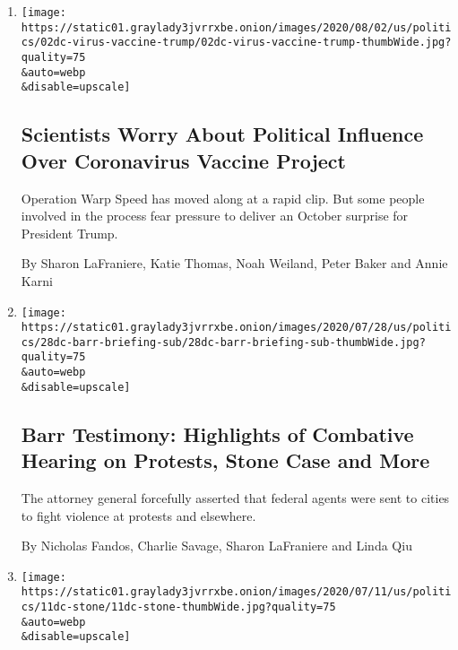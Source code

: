 \begin{enumerate}
\def\labelenumi{\arabic{enumi}.}
\item
  \href{/2020/08/02/us/politics/coronavirus-vaccine.html}{}

  \texttt{[image: https://static01.graylady3jvrrxbe.onion/images/2020/08/02/us/politics/02dc-virus-vaccine-trump/02dc-virus-vaccine-trump-thumbWide.jpg?quality=75\\\&auto=webp\\\&disable=upscale]}

  \hypertarget{scientists-worry-about-political-influence-over-coronavirus-vaccine-project}{%
  \subsection{Scientists Worry About Political Influence Over
  Coronavirus Vaccine
  Project}\label{scientists-worry-about-political-influence-over-coronavirus-vaccine-project}}

  Operation Warp Speed has moved along at a rapid clip. But some people
  involved in the process fear pressure to deliver an October surprise
  for President Trump.

  By Sharon LaFraniere, Katie Thomas, Noah Weiland, Peter Baker and
  Annie Karni
\item
  \href{/2020/07/28/us/politics/william-barr-house-judiciary-hearing.html}{}

  \texttt{[image: https://static01.graylady3jvrrxbe.onion/images/2020/07/28/us/politics/28dc-barr-briefing-sub/28dc-barr-briefing-sub-thumbWide.jpg?quality=75\\\&auto=webp\\\&disable=upscale]}

  \hypertarget{barr-testimony-highlights-of-combative-hearing-on-protests-stone-case-and-more}{%
  \subsection{Barr Testimony: Highlights of Combative Hearing on
  Protests, Stone Case and
  More}\label{barr-testimony-highlights-of-combative-hearing-on-protests-stone-case-and-more}}

  The attorney general forcefully asserted that federal agents were sent
  to cities to fight violence at protests and elsewhere.

  By Nicholas Fandos, Charlie Savage, Sharon LaFraniere and Linda Qiu
\item
  \href{/2020/07/11/us/politics/trump-roger-stone.html}{}

  \texttt{[image: https://static01.graylady3jvrrxbe.onion/images/2020/07/11/us/politics/11dc-stone/11dc-stone-thumbWide.jpg?quality=75\\\&auto=webp\\\&disable=upscale]}


\end{enumerate}
